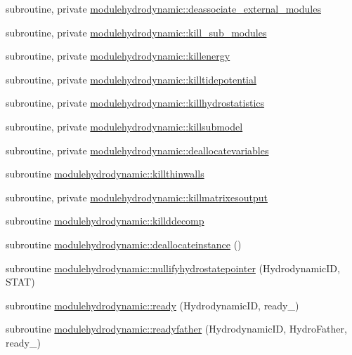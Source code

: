 \begin{DoxyCompactItemize}
subroutine, private \mbox{\hyperlink{namespacemodulehydrodynamic_a9ab4535ec430fb9f040e8027eab7128d}{modulehydrodynamic\+::deassociate\+\_\+external\+\_\+modules}}
\item 
subroutine, private \mbox{\hyperlink{namespacemodulehydrodynamic_ad33fcf640ab52de6097223c4aeb342c0}{modulehydrodynamic\+::kill\+\_\+sub\+\_\+modules}}
\item 
subroutine, private \mbox{\hyperlink{namespacemodulehydrodynamic_a85ec37a513035b769326676058893ac1}{modulehydrodynamic\+::killenergy}}
\item 
subroutine, private \mbox{\hyperlink{namespacemodulehydrodynamic_ab35b45e7f241087188692a17e57b81fe}{modulehydrodynamic\+::killtidepotential}}
\item 
subroutine, private \mbox{\hyperlink{namespacemodulehydrodynamic_a4ef7d15d1c97d54f708e71f1262485b0}{modulehydrodynamic\+::killhydrostatistics}}
\item 
subroutine, private \mbox{\hyperlink{namespacemodulehydrodynamic_a9b2046e58cfbfc36752c1c596ac76085}{modulehydrodynamic\+::killsubmodel}}
\item 
subroutine, private \mbox{\hyperlink{namespacemodulehydrodynamic_a97e376130dedc4213ae9f7bd331d237a}{modulehydrodynamic\+::deallocatevariables}}
\item 
subroutine \mbox{\hyperlink{namespacemodulehydrodynamic_a93dc7bf3dc53936a78e774fea543f5d9}{modulehydrodynamic\+::killthinwalls}}
\item 
subroutine, private \mbox{\hyperlink{namespacemodulehydrodynamic_a8a24bb3b15a1b676c23a6ecd0a1defa8}{modulehydrodynamic\+::killmatrixesoutput}}
\item 
subroutine \mbox{\hyperlink{namespacemodulehydrodynamic_afcb6ada5d2c8c5ce856cc9efcbb38077}{modulehydrodynamic\+::killddecomp}}
\item 
subroutine \mbox{\hyperlink{namespacemodulehydrodynamic_aabd13dda5e1f35caf879873becb922c4}{modulehydrodynamic\+::deallocateinstance}} ()
\item 
subroutine \mbox{\hyperlink{namespacemodulehydrodynamic_a3c9ae88187f7c83938a730ba2aecc5b4}{modulehydrodynamic\+::nullifyhydrostatepointer}} (Hydrodynamic\+ID, S\+T\+AT)
\item 
subroutine \mbox{\hyperlink{namespacemodulehydrodynamic_a541821548a44af36e71f5eddedae890e}{modulehydrodynamic\+::ready}} (Hydrodynamic\+ID, ready\+\_\+)
\item 
subroutine \mbox{\hyperlink{namespacemodulehydrodynamic_a3590684b189672df14d8ed25dc6e6156}{modulehydrodynamic\+::readyfather}} (Hydrodynamic\+ID, Hydro\+Father, ready\+\_\+)

\end{DoxyCompactItemize}
